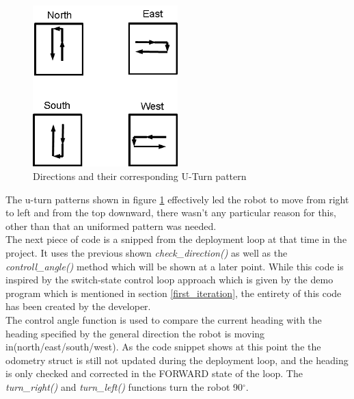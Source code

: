 \begin{figure}[h]
\centering
\includegraphics[width = 0.5\textwidth]{../../figures/direction_uturn_pattern}
\caption{Directions and their corresponding U-Turn pattern}
\label{directions_uturn_pattern}
\end{figure}

The u-turn patterns shown in figure \ref{directions_uturn_pattern} effectively led the robot to move from right to left and from the top downward, there wasn't any particular reason for this, other than that an uniformed pattern was needed. \\
The next piece of code is a snipped from the deployment loop at that time in the project. It uses the previous shown \textit{check\_direction()} as well as the \textit{controll\_angle()} method which will be shown at a later point. While this code is inspired by the switch-state control loop approach which is given by the demo program which is mentioned in section \ref{first_iteration}, the entirety of this code has been created by the developer. \\
The control angle function is used to compare the current heading with the heading specified by the general direction the robot is moving in(north/east/south/west).
As the code snippet shows at this point the the odometry struct is still not updated during the deployment loop, and the heading is only checked and corrected in the FORWARD state of the loop.
The \textit{turn\_right()} and \textit{turn\_left()} functions turn the robot 90$^{\circ}$.

